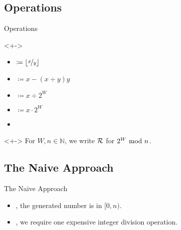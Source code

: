 \subsection{Operations}
\begin{frame}{Operations}
    \pause 
    \begin{definition}<+->
        \begin{itemize}[<+->]
            \item {}  $\coloneqq \lfloor\nicefrac{x}{y}\rfloor$
            \item {}  $\coloneqq x - (x \div y)y$
            \item {}  $\coloneqq x \div 2^W$
            \item {}  $\coloneqq x \cdot 2^W$
            \item {}   
        \end{itemize}
    \end{definition}

    \vspace*{0.5cm}

    \begin{definition}<+->
        For $W,n \in \mathbb{N}$, we write $\mathcal{R}$ for $2^W \ \mathrm{mod}\ n$.
    \end{definition}

\end{frame}



\subsection{The Naive Approach}\label{sec:1.3}
\begin{frame}{The Naive Approach}
    \pause 

    \begin{itemize}[<+->]
        \item {}, the generated number is in $[0,n)$.
    \end{itemize}

    \begin{itemize}[<+->]
        \item {}, we require one expensive integer division operation.
    \end{itemize}

    \onslide<+->{Is the generated number uniform in $[0,n)$?}
\end{frame}



